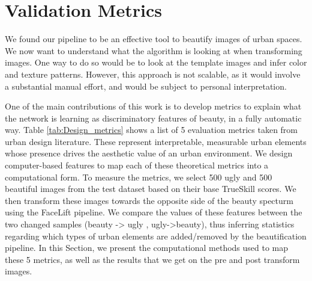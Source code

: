\section{Validation Metrics}
We found our pipeline to be an effective tool to beautify images of urban spaces. We now want to understand what the algorithm is looking at when transforming images. One way to do so would be to look at the template images and infer color and texture patterns. However, this approach is not scalable, as it would involve a substantial manual effort, and would be subject to personal interpretation. 
 
%
One of the main contributions of this work is to develop metrics%
to explain what the network is learning %
as discriminatory features of beauty, in a fully automatic way. %
Table \ref{tab:Design_metrics} shows a list of 5 evaluation metrics%
taken from urban design literature\cite{ewing2013measuring,alexander1977pattern}. These represent interpretable, measurable urban elements whose presence drives the aesthetic value of an urban environment. %
We design computer-based features to map each of these theoretical metrics into a computational form. 
To measure the metrics, we select 500 ugly and 500 beautiful images from the test dataset based on their base TrueSkill scores. We then transform these images towards the opposite side of the beauty specturm using the FaceLift pipeline. 
We compare the values of these features between the two changed samples (beauty -> ugly , ugly->beauty), thus inferring statistics regarding which types of urban elements are added/removed by the beautification pipeline.
In this Section, we present the computational methods used to map these 5 metrics, as well as the results that we get on the pre and post transform images. 


